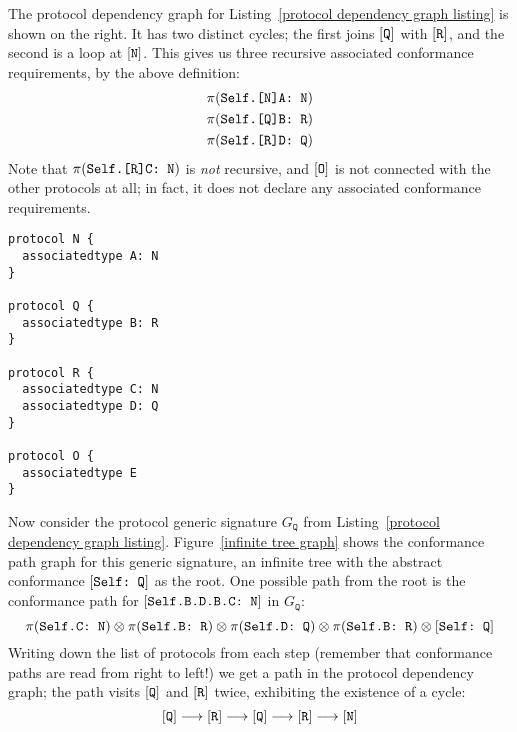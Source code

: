 \documentclass[../generics]{subfiles}
\begin{document}
\smallskip

\begin{wrapfigure}[11]{l}{4.5cm}
\end{wrapfigure}
The protocol dependency graph for Listing~\ref{protocol dependency graph listing} is shown on the right. It has two distinct cycles; the first joins $[\texttt{Q}]$ with $[\texttt{R}]$, and the second is a loop at $[\texttt{N}]$. This gives us three recursive associated conformance requirements, by the above definition:
\begin{gather*}
\pi(\texttt{Self.[N]A:~N})\\
\pi(\texttt{Self.[Q]B:~R})\\
\pi(\texttt{Self.[R]D:~Q})
\end{gather*}
Note that $\pi(\texttt{Self.[R]C:~N})$ is \emph{not} recursive, and $[\texttt{O}]$ is not connected with the other protocols at all; in fact, it does not declare any associated conformance requirements.

\smallskip

\begin{listing}\label{protocol dependency graph listing}
\begin{Verbatim}
protocol N {
  associatedtype A: N
}

protocol Q {
  associatedtype B: R
}

protocol R {
  associatedtype C: N
  associatedtype D: Q
}

protocol O {
  associatedtype E
}
\end{Verbatim}
\end{listing}

Now consider the protocol generic signature $G_\texttt{Q}$ from Listing~\ref{protocol dependency graph listing}. Figure~\ref{infinite tree graph} shows the conformance path graph for this generic signature, an infinite tree with the abstract conformance $[\texttt{Self:~Q}]$ as the root. One possible path from the root is the conformance path for $[\texttt{Self.B.D.B.C:~N}]$ in $G_\texttt{Q}$:
\[
\pi(\texttt{Self.C:~N}) \otimes \pi(\texttt{Self.B:~R}) \otimes \pi(\texttt{Self.D:~Q}) \otimes \pi(\texttt{Self.B:~R}) \otimes [\texttt{Self:~Q}]
\]
Writing down the list of protocols from each step (remember that conformance paths are read from right to left!) we get a path in the protocol dependency graph; the path visits $[\texttt{Q}]$ and $[\texttt{R}]$ twice, exhibiting the existence of a cycle:
\[[\texttt{Q}]\longrightarrow[\texttt{R}]\longrightarrow[\texttt{Q}]\longrightarrow[\texttt{R}]\longrightarrow[\texttt{N}]\]
\end{document}
